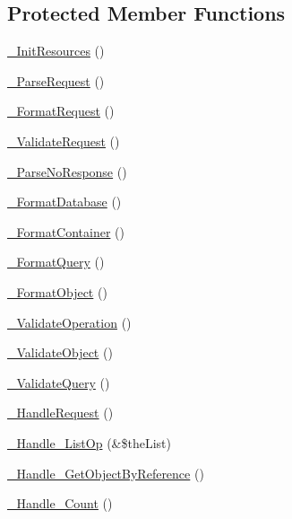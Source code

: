 \subsection*{Protected Member Functions}
\begin{DoxyCompactItemize}
\item 
\hyperlink{class_c_mongo_data_wrapper_a33ff97c26b97d00a67f97d41f67ce47b}{\-\_\-\-Init\-Resources} ()
\item 
\hyperlink{class_c_mongo_data_wrapper_a8ac2f23cfc78f3fba6b256718ed2d105}{\-\_\-\-Parse\-Request} ()
\item 
\hyperlink{class_c_mongo_data_wrapper_abbc0d41394dda4a27eefa8481065749a}{\-\_\-\-Format\-Request} ()
\item 
\hyperlink{class_c_mongo_data_wrapper_a3d06376cb588e5c26751bff3f0083ef5}{\-\_\-\-Validate\-Request} ()
\item 
\hyperlink{class_c_mongo_data_wrapper_adb77016dd91f53f6e5d74a7390020c4d}{\-\_\-\-Parse\-No\-Response} ()
\item 
\hyperlink{class_c_mongo_data_wrapper_a15b44586fe5de968efb0edbe96f3da60}{\-\_\-\-Format\-Database} ()
\item 
\hyperlink{class_c_mongo_data_wrapper_a117d32ff4a01a54a7ff6203ba0ca66b7}{\-\_\-\-Format\-Container} ()
\item 
\hyperlink{class_c_mongo_data_wrapper_a807db77c3c4f7708e86873a0447b83ff}{\-\_\-\-Format\-Query} ()
\item 
\hyperlink{class_c_mongo_data_wrapper_a2642638da121e471c7ea1fbb61f6f3ef}{\-\_\-\-Format\-Object} ()
\item 
\hyperlink{class_c_mongo_data_wrapper_a406b81115b5f3957e6d40ee49ae85a13}{\-\_\-\-Validate\-Operation} ()
\item 
\hyperlink{class_c_mongo_data_wrapper_a9bb974219920f005b1cdba39793b84d5}{\-\_\-\-Validate\-Object} ()
\item 
\hyperlink{class_c_mongo_data_wrapper_aa2ae2292a247d94c9b1dfa13d9a4fb85}{\-\_\-\-Validate\-Query} ()
\item 
\hyperlink{class_c_mongo_data_wrapper_a811af7e7574a459bc56afa3afa99e1a8}{\-\_\-\-Handle\-Request} ()
\item 
\hyperlink{class_c_mongo_data_wrapper_a1ca51f95510a94bf26e004ef2e8e8d37}{\-\_\-\-Handle\-\_\-\-List\-Op} (\&\$the\-List)
\item 
\hyperlink{class_c_mongo_data_wrapper_a226970d3cfb96f8e85e46d3943c25089}{\-\_\-\-Handle\-\_\-\-Get\-Object\-By\-Reference} ()
\item 
\hyperlink{class_c_mongo_data_wrapper_ae7cc52809c8b6cea94c84d5f64a4308b}{\-\_\-\-Handle\-\_\-\-Count} ()

\end{DoxyCompactItemize}
